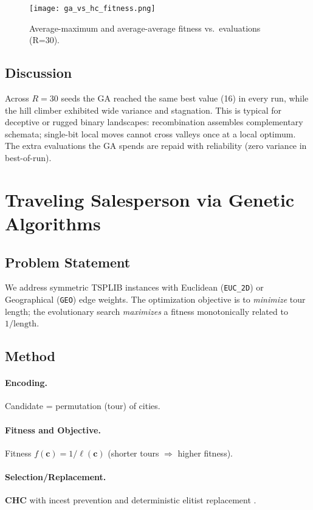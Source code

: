 \documentclass{article}
\begin{document}
\begin{figure}[H]
    \centering
    \texttt{[image: ga\_vs\_hc\_fitness.png]}
    \caption{Average-maximum and average-average fitness vs.\ evaluations (R=30).}
\end{figure}

\subsection{Discussion}
Across $R{=}30$ seeds the GA reached the same best value (16) in every run, while the hill climber exhibited wide variance and stagnation. This is typical for deceptive or rugged binary landscapes: recombination assembles complementary schemata; single-bit local moves cannot cross valleys once at a local optimum. The extra evaluations the GA spends are repaid with reliability (zero variance in best-of-run).

\section{Traveling Salesperson via Genetic Algorithms}
\subsection{Problem Statement}
We address symmetric TSPLIB instances with Euclidean (\texttt{EUC\_2D}) or Geographical (\texttt{GEO}) edge weights. The optimization objective is to \emph{minimize} tour length; the evolutionary search \emph{maximizes} a fitness monotonically related to $1/\text{length}$.

\subsection{Method}
\paragraph{Encoding.} Candidate = permutation (tour) of cities.
\paragraph{Fitness and Objective.} Fitness $f(\mathbf{c}) = 1/\ell(\mathbf{c})$ (shorter tours $\Rightarrow$ higher fitness).
\paragraph{Selection/Replacement.} \textbf{CHC} with incest prevention and deterministic elitist replacement \cite{eshelman1991chc}.
\end{document}
